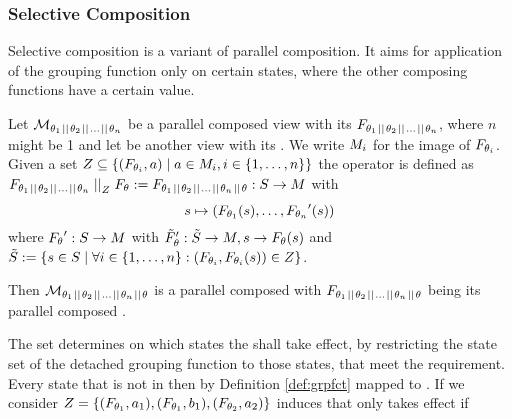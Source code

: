 \documentclass[preview]{standalone}
\begin{document}
\subsubsection{Selective Composition} \label{subsec:selecitvecomp}
Selective composition is a variant of parallel composition. It aims for application of the grouping function only on certain states, where the other composing functions have a certain value.


\begin{definition}
	Let $\view[\viewppty_1 \pll \viewppty_2 \pll \dots \pll 
	\viewppty_n]$ be a parallel composed view with its \grpfctN $\grpfct[{\viewppty_1 \pll \viewppty_2 \pll \dots \pll \viewppty_n}]$, where $n$ might be 1 and let \view be another view with its \grpfctN \grpfct. 
	We write $\imggrp_i$ for the image of $\grpfct[\viewppty_i]$. 
	Given a set $\compselectset \subseteq \{ (\grpfct[\viewppty_i], a) \mid a \in \imggrp_i, i \in \{1, \dots, n\}\}$ the operator \compselectpure is defined as $\grpfct[{\viewppty_1 \pll \viewppty_2 \pll \dots \pll \viewppty_n}] \compselect \grpfct := \grpfct[{\viewppty_1 \pll \viewppty_2 \pll \dots \pll \viewppty_n} \pll \viewppty]: \states \to \arbset$ with
	\[
	\state \mapsto (\grpfct[\viewppty_1](\state), \dots, \grpfct[\viewppty_n]'(\state))
	\]
	where $\grpfct' : \states \to \imggrp$ with $\grpfctsub' : \smstates \to \imggrp, \state \to \grpfct(\state)$ and $\smstates := \{\state \in \states \mid \forall i \in \{1, \dots, n\} : (\grpfct[\viewppty_i], \grpfct[\viewppty_i](\state)) \in \compselectset\}$.
	
	
	
	\noindent
	Then $\view[\viewppty_1 \pll \viewppty_2 \pll \dots \pll 
	\viewppty_n \pll \viewppty]$ is a parallel composed \viewN with $\grpfct[{\viewppty_1 \pll \viewppty_2 \pll \dots \pll \viewppty_n} \pll \viewppty]$ being its parallel composed \grpfctN.
	\label{def:compositionselective}
\end{definition}

The set \compselectset determines on which states the \viewN \view shall take effect, by restricting the state set \smstates of the detached grouping function to those states, that meet the requirement. Every state that is not in \smstates then by Definition \ref{def:grpfct} mapped to \remelem. If we consider $\compselectset = \{(\grpfct[\viewppty_1], a_1),(\grpfct[\viewppty_1], b_1), (\grpfct[\viewppty_2], a_2)\}$ induces that \view only takes effect if 
\end{document}
